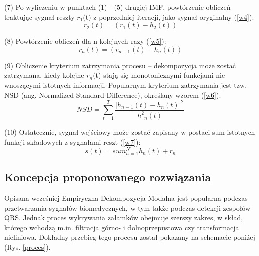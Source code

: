 \documentclass[10pt,a4paper]{article}
\begin{document}
(7) Po wyliczeniu w punktach (1) - (5) drugiej IMF, powtórzenie obliczeń traktując sygnał
reszty $r_1$(t) z poprzedniej iteracji, jako sygnał oryginalny (\ref{w4}):
\begin{equation}
r_2(t) = (r_1(t) - h_2(t))
\label{w4}
\end{equation}

(8) Powtórzenie obliczeń dla n-kolejnych razy (\ref{w5}):
\begin{equation}
r_n(t) = (r_{n-1}(t) - h_n(t))
\label{w5}
\end{equation}

(9) Obliczenie kryterium zatrzymania procesu – dekompozycja może zostać zatrzymana,
kiedy kolejne $r_n$(t) stają się monotonicznymi funkcjami nie wnoszącymi istotnych
informacji. Popularnym kryterium zatrzymania jest tzw. NSD (ang. Normalized
Standard Difference), określany wzorem (\ref{w6}):
\begin{equation}
NSD=\sum_{t=1}^{T} \frac{|h_{n-1}(t)-h_n(t)|^2}{{h^2}_n(t)}
\label{w6}
\end{equation}

(10) Ostatecznie, sygnał wejściowy może zostać zapisany w postaci sum istotnych
funkcji składowych z sygnałami reszt (\ref{w7}):
\begin{equation}
\label{w7}
s(t)=sum_{n=1}^{N} h_n(t)+ r_n 
\end{equation}

\subsection{Koncepcja proponowanego rozwiązania}

Opisana wcześniej Empiryczna Dekompozycja Modalna jest popularna podczas przetwarzania
sygnałów biomedycznych, w tym także podczas detekcji zespołów QRS. Jednak proces
wykrywania załamków obejmuje szerszy zakres, w skład, którego wchodzą m.in. filtracja
górno- i dolnoprzepustowa czy transformacja nieliniowa. Dokładny przebieg tego procesu
został pokazany na schemacie poniżej (Rys. \ref{proces})\cite{trzy}.
\end{document}
